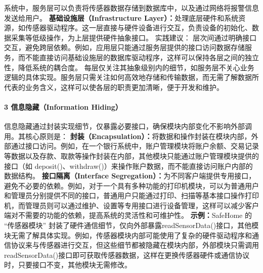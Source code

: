 系统中，服务层可以负责将传感器数据存储到数据库中，以及通过网络将报警信息发送给用户。 \textbf{基础设施层（Infrastructure
Layer）：}处理底层硬件和系统资源，如传感器驱动程序。这一层直接与硬件设备进行交互，负责设备的初始化、数据采集等低级操作，为上层提供硬件抽象接口。 实践建议：
层次间通过明确接口交互，避免跨层依赖。例如，应用层只能通过服务层提供的接口访问数据存储服务，而不能直接访问基础设施层的数据库驱动程序，这样可以保持各层之间的独立性，降低系统的耦合度。
每层仅关注其抽象级别内的细节，如服务层不关心业务逻辑的具体实现。服务层只需关注如何高效地存储和传输数据，而无需了解数据所代表的业务含义，这样可以使各层的职责更加清晰，便于开发和维护。 \paragraph{3
信息隐藏（Information Hiding）}\label{ux4fe1ux606fux9690ux85cfinformation-hiding} 信息隐藏通过封装实现细节，仅暴露必要接口，确保模块内部变化不影响外部调用。其核心原则是：
\textbf{封装（Encapsulation）：}将数据和操作封装在模块内部，外部通过接口访问。例如，在一个银行系统中，账户管理模块将账户余额、交易记录等数据以及存款、取款等操作封装在内部，其他模块只能通过账户管理模块提供的接口（如
deposit()、withdraw()）来操作账户数据，而不能直接访问账户内部的数据结构。 \textbf{接口隔离（Interface
Segregation）：}为不同客户端提供专用接口，避免不必要的依赖。例如，对于一个具有多种功能的打印机模块，可以为普通用户和管理员分别提供不同的接口，普通用户只能通过打印、扫描等基本接口操作打印机，而管理员则可以通过维护、设置等专用接口进行设备管理，这样可以减少客户端对不需要的功能的依赖，提高系统的灵活性和可维护性。
\textbf{示例：}SafeHome 的 ``传感器模块''
封装了硬件通信细节，仅向外部暴露readSensorData()接口，其他模块无需了解具体实现。例如，传感器模块内部可能使用了复杂的硬件驱动程序和通信协议来与传感器进行交互，但这些细节都被隐藏在模块内部，外部模块只需调用readSensorData()接口即可获取传感器数据，这样在更换传感器硬件或通信协议时，只要接口不变，其他模块无需修改。

